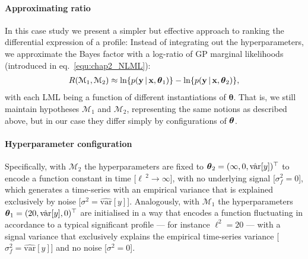       \paragraph{Approximating ratio} In this case study we present a simpler
      but effective approach to ranking the differential expression of a profile:
      Instead of integrating out the hyperparameters, we approximate the Bayes
      factor with a log-ratio of GP marginal likelihoods (introduced in eq.~\ref{equ:chap2_NLML}):
      \begin{align} \label{equ:chap2_LMLratio}
	R(\mathcal{M}_1, \mathcal{M}_2)
	\approx \ln \{p(\mathbf{y} \,|\, \mathbf{x}, \boldsymbol{\theta}_1)\} - \ln \{p(\mathbf{y} \,|\, \mathbf{x}, \boldsymbol{\theta}_2)\},
      \end{align}
      with each LML being a function of different instantiations of
      $\boldsymbol{\theta}$. That is, we still maintain hypotheses $\mathcal{M}_1$ and
      $\mathcal{M}_2$, representing the same notions as described above, but in
      our case they differ simply by configurations of $\boldsymbol{\theta}$.

      \paragraph{Hyperparameter configuration} Specifically, with $\mathcal{M}_2$ the hyperparameters are fixed to
      $\boldsymbol{\theta}_2 = (\infty, 0, \hat{\textrm{var}}[y])^\top$ to encode
      a function constant in time [$\ell\,^2 \rightarrow \infty$], with no
      underlying  signal [$\sigma^2_f = 0$], which generates a time-series with an empirical
      variance that is explained exclusively by noise [$\sigma^2 = \hat{\textrm{var}}[y]$].
      Analogously, with $\mathcal{M}_1$ the hyperparameters
      $\boldsymbol{\theta}_1 = (20, \hat{\textrm{var}}[y], 0)^\top$ are initialised in a way that encodes a function
      fluctuating in accordance to a typical significant profile --- for instance $\ell^2 = 20$ ---
      with a signal variance that exclusively explains the empirical
      time-series variance [$\sigma^2_f = \hat{\textrm{var}}[y]$] and no noise [$\sigma^2 = 0$].

